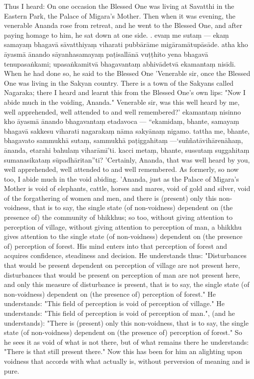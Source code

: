 \documentclass[11pt]{article}
\begin{document}
\begin{paracol}{2}
	\begin{column}
Thus I heard: On one occasion the Blessed One was living at Savatthi in the Eastern Park, the Palace of Migara's Mother. Then when it was evening, the venerable Ananda rose from retreat, and he went to the Blessed One, and after paying homage to him, he sat down at one side.
. evaṃ me sutaṃ — ekaṃ samayaṃ bhagavā sāvatthiyaṃ viharati pubbārāme migāramātupāsāde. atha kho āyasmā ānando sāyanhasamayaṃ paṭisallānā vuṭṭhito yena bhagavā tenupasaṅkami; upasaṅkamitvā bhagavantaṃ abhivādetvā ekamantaṃ nisīdi.
 \switchcolumn*
When he had done so, he said to the Blessed One 'Venerable sir, once the Blessed One was living in the Sakyan country. There is a town of the Sakyans called Nagaraka; there I heard and learnt this from the Blessed One's own lips: "Now I abide much in the voiding, Ananda." Venerable sir, was this well heard by me, well apprehended, well attended to and well remembered?'
\switchcolumn
ekamantaṃ nisinno kho āyasmā ānando bhagavantaṃ etadavoca — “ekamidaṃ, bhante, samayaṃ bhagavā sakkesu viharati nagarakaṃ nāma sakyānaṃ nigamo. tattha me, bhante, bhagavato sammukhā sutaṃ, sammukhā paṭiggahitaṃ —‘suññatāvihārenāhaṃ, ānanda, etarahi bahulaṃ viharāmī’ti. kacci metaṃ, bhante, sussutaṃ suggahitaṃ sumanasikataṃ sūpadhāritan”ti?
\switchcolumn*
'Certainly, Ananda, that was well heard by you, well apprehended, well attended to and well remembered. As formerly, so now too, I abide much in the void abiding. 'Ananda, just as the Palace of Migara's Mother is void of elephants, cattle, horses and mares, void of gold and silver, void of the forgathering of women and men, and there is (present) only this non-voidness, that is to say, the single state (of non-voidness) dependent on (the presence of) the community of bhikkhus; so too, without giving attention to perception of village, without giving attention to perception of man, a bhikkhu gives attention to the single state (of non-voidness) dependent on (the presence of) perception of forest. His mind enters into that perception of forest and acquires confidence, steadiness and decision. He understands thus: "Disturbances that would be present dependent on perception of village are not present here, disturbances that would be present on perception of man are not present here, and only this measure of disturbance is present, that is to say, the single state (of non-voidness) dependent on (the presence of) perception of forest." He understands: "This field of perception is void of perception of village." He understands: "This field of perception is void of perception of man.", (and he understands): "There is (present) only this non-voidness, that is to say, the single state (of non-voidness) dependent on (the presence of) perception of forest." So he sees it as void of what is not there, but of what remains there he understands: "There is that still present there." Now this has been for him an alighting upon voidness that accords with what actually is, without perversion of meaning and is pure.

\end{column}
\end{paracol}
\end{document}

